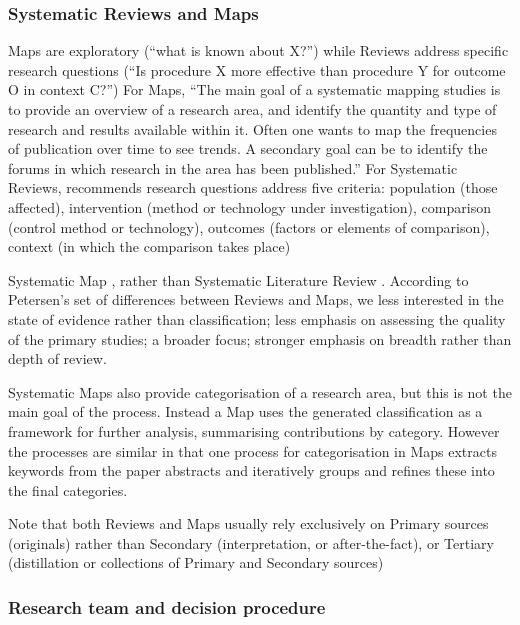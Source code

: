 \subsubsection{Systematic Reviews and Maps}

Maps are exploratory (``what is known about X?'') while Reviews address specific research questions (``Is procedure X more effective than procedure Y for outcome O in context C?'')
For Maps, ``The main goal of a systematic mapping studies is to provide an overview of a research area, and identify the quantity and type of research and results available within it. Often one wants to map the frequencies of publication over time to see trends. A secondary goal can be to identify the forums in which research in the area has been published.'' \parencite{Petersen:2008fk}
For Systematic Reviews, \cite{Kitchenham:2007nx} recommends research questions address five criteria: population (those affected), intervention (method or technology under investigation), comparison (control method or technology), outcomes (factors or elements of comparison), context (in which the comparison takes place)

Systematic Map \parencite{Petersen:2008fk}, rather than Systematic Literature Review \parencite{Kitchenham:2007nx}. According to Petersen's set of differences between Reviews and Maps, we less interested in the state of  evidence rather than classification; less emphasis on assessing the quality of the primary studies; a broader focus; stronger emphasis on breadth rather than depth of review.

Systematic Maps also provide categorisation of a research area, but this is not the main goal of the process. Instead a Map uses the generated classification as a framework for further analysis, summarising contributions by category. However the processes are similar in that one process for categorisation in Maps \parencite{Petersen:2008fk} extracts keywords from the paper abstracts and iteratively groups and refines these into the final categories.

Note that both Reviews and Maps usually rely exclusively on Primary sources (originals) rather than Secondary (interpretation, or after-the-fact), or Tertiary (distillation or collections of Primary and Secondary sources)

\subsubsection{Research team and decision procedure}


